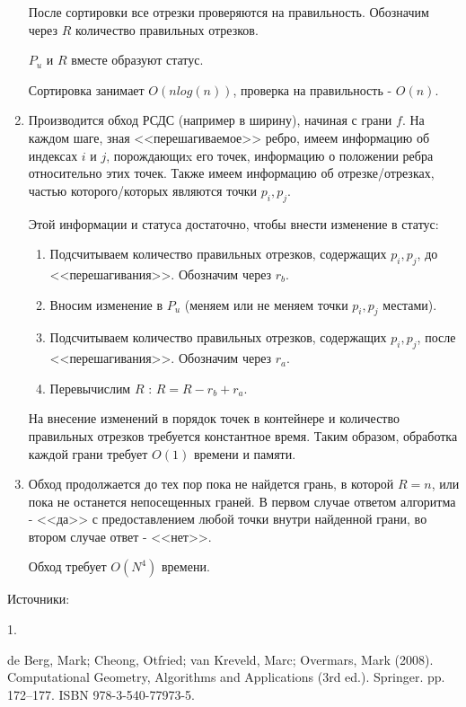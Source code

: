 \documentclass[letterpaper,12pt]{article}
\begin{document}
\begin{enumerate}
            После сортировки все отрезки проверяются на правильность.
            Обозначим через $R$ количество правильных отрезков.

            $P_u$ и $R$ вместе образуют статус.

            Сортировка занимает $O(nlog(n))$, проверка на 
            правильность - $O(n)$.
      \item Производится обход РСДС (например в ширину), начиная с 
            грани $f$. На каждом шаге, зная <<перешагиваемое>> ребро, 
            имеем информацию об индексах $i$ и $j$, порождающиx его точек,
            информацию о положении ребра относительно этих точек. 
            Также имеем информацию об отрезке/отрезках, частью 
            которого/которых являются точки $p_i, p_j$.

            Этой информации и статуса достаточно, чтобы внести изменение 
            в статус: 
            \begin{enumerate}
                  \item Подсчитываем количество правильных отрезков,
                        содержащих $p_i, p_j$, до <<перешагивания>>.
                        Обозначим через $r_b$.
                  \item Вносим изменение в $P_u$ (меняем или не меняем
                        точки $p_i, p_j$ местами).
                  \item Подсчитываем количество правильных отрезков,
                        содержащих $p_i, p_j$, после <<перешагивания>>.
                        Обозначим через $r_a$.
                  \item Перевычислим $R$ : $R = R - r_b + r_a$.
            \end{enumerate}

            На внесение изменений в порядок точек в контейнере и 
            количество правильных отрезков требуется константное время.      
            Таким образом, обработка каждой грани требует $O(1)$ времени 
            и памяти.
      \item Обход продолжается до тех пор пока не найдется грань, 
            в которой $R = n$, или пока не останется непосещенных граней.
            В первом случае ответом алгоритма - <<да>> с предоставлением 
            любой точки внутри найденной грани, 
            во втором случае ответ - <<нет>>.
            
            Обход требует $O(N^4)$ времени.
\end{enumerate}

Источники:

\hypertarget{literature_1}{1.} de Berg, Mark; Cheong, Otfried; van Kreveld, Marc; Overmars, Mark (2008). 
Computational Geometry, Algorithms and Applications (3rd ed.). 
Springer. pp. 172–177. ISBN 978-3-540-77973-5.
\end{document}
